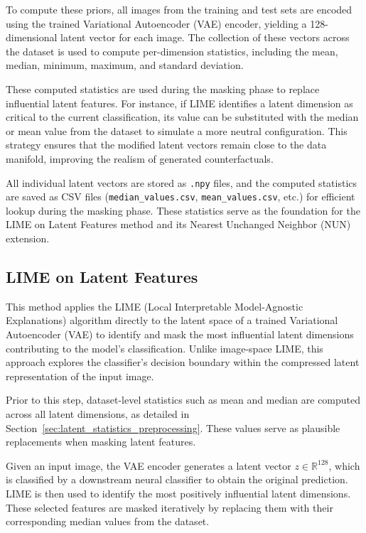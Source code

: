 To compute these priors, all images from the training and test sets are encoded using the trained Variational Autoencoder (VAE) encoder, yielding a 128-dimensional latent vector for each image. The collection of these vectors across the dataset is used to compute per-dimension statistics, including the mean, median, minimum, maximum, and standard deviation.

These computed statistics are used during the masking phase to replace influential latent features. For instance, if LIME identifies a latent dimension as critical to the current classification, its value can be substituted with the median or mean value from the dataset to simulate a more neutral configuration. This strategy ensures that the modified latent vectors remain close to the data manifold, improving the realism of generated counterfactuals.

All individual latent vectors are stored as \texttt{.npy} files, and the computed statistics are saved as CSV files (\texttt{median\_values.csv}, \texttt{mean\_values.csv}, etc.) for efficient lookup during the masking phase. These statistics serve as the foundation for the LIME on Latent Features method and its Nearest Unchanged Neighbor (NUN) extension.

\subsection{LIME on Latent Features}
\label{sec:lime_on_latent}

This method applies the LIME (Local Interpretable Model-Agnostic Explanations) algorithm directly to the latent space of a trained Variational Autoencoder (VAE) to identify and mask the most influential latent dimensions contributing to the model's classification. Unlike image-space LIME, this approach explores the classifier’s decision boundary within the compressed latent representation of the input image.

Prior to this step, dataset-level statistics such as mean and median are computed across all latent dimensions, as detailed in Section~\ref{sec:latent_statistics_preprocessing}. These values serve as plausible replacements when masking latent features.

Given an input image, the VAE encoder generates a latent vector $z \in \mathbb{R}^{128}$, which is classified by a downstream neural classifier to obtain the original prediction. LIME is then used to identify the most positively influential latent dimensions. These selected features are masked iteratively by replacing them with their corresponding median values from the dataset.

